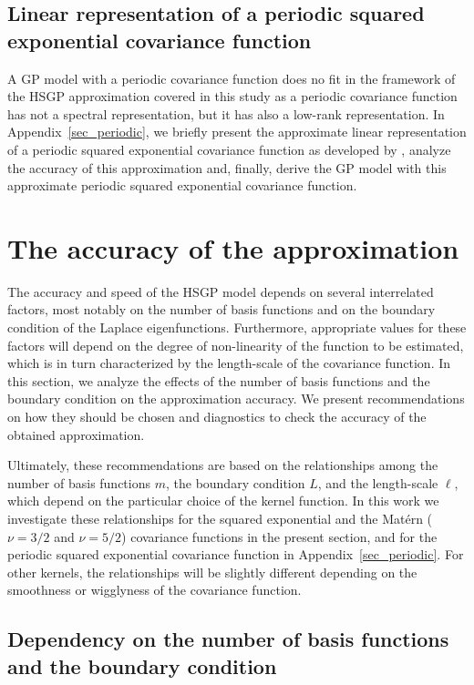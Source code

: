 \subsection{Linear representation of a periodic squared exponential covariance function} \label{sec_method_periodic}

A GP model with a periodic covariance function does no fit in the framework of the HSGP approximation covered in this study as a periodic covariance function has not a spectral representation, but it has also a low-rank representation. In Appendix~\ref{sec_periodic}, we briefly present the approximate linear representation of a periodic squared exponential covariance function as developed by \citet{solin2014explicit}, analyze the accuracy of this approximation and, finally, derive the GP model with this approximate periodic squared exponential covariance function.

\section{The accuracy of the approximation}\label{sec_accuracy}

The accuracy and speed of the HSGP model depends on several interrelated factors, most notably on the number of basis functions and on the boundary condition of the Laplace eigenfunctions. Furthermore, appropriate values for these factors will depend on the degree of non-linearity of the function to be estimated, which is in turn characterized by the length-scale of the covariance function. In this section, we analyze the effects of the number of basis functions and the boundary condition on the approximation accuracy. We present recommendations on how they should be chosen and diagnostics to check the accuracy of the obtained approximation. 

Ultimately, these recommendations are based on the relationships among the number of basis functions $m$, the boundary condition $L$, and the length-scale $\ell$, which depend on the particular choice of the kernel function. In this work we investigate these relationships for the squared exponential and the Mat{\'e}rn ($\nu=3/2$ and $\nu=5/2$) covariance functions in the present section, and for the periodic squared exponential covariance function in Appendix~\ref{sec_periodic}. For other kernels, the relationships will be slightly different depending on the smoothness or wigglyness of the covariance function.

\subsection{Dependency on the number of basis functions and the boundary condition} \label{subsec_dependency}

